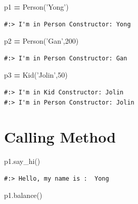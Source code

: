 \documentclass[
]{book}
\newenvironment{Shaded}{\begin{snugshade}}{\end{snugshade}}
\newcommand{\DecValTok}[1]{\textcolor[rgb]{0.06,0.06,0.06}{#1}}
\newcommand{\NormalTok}[1]{#1}
\newcommand{\OperatorTok}[1]{\textcolor[rgb]{0.43,0.43,0.43}{\textbf{#1}}}
\newcommand{\StringTok}[1]{\textcolor[rgb]{0.5,0.5,0.5}{#1}}
\begin{document}
\begin{Shaded}
\begin{Highlighting}[]
\NormalTok{p1 }\OperatorTok{=}\NormalTok{ Person(}\StringTok{'Yong'}\NormalTok{)  }
\end{Highlighting}
\end{Shaded}

\begin{verbatim}
#:> I'm in Person Constructor: Yong
\end{verbatim}

\begin{Shaded}
\begin{Highlighting}[]
\NormalTok{p2 }\OperatorTok{=}\NormalTok{ Person(}\StringTok{'Gan'}\NormalTok{,}\DecValTok{200}\NormalTok{)}
\end{Highlighting}
\end{Shaded}

\begin{verbatim}
#:> I'm in Person Constructor: Gan
\end{verbatim}

\begin{Shaded}
\begin{Highlighting}[]
\NormalTok{p3 }\OperatorTok{=}\NormalTok{ Kid(}\StringTok{'Jolin'}\NormalTok{,}\DecValTok{50}\NormalTok{)}
\end{Highlighting}
\end{Shaded}

\begin{verbatim}
#:> I'm in Kid Constructor: Jolin
#:> I'm in Person Constructor: Jolin
\end{verbatim}

\hypertarget{calling-method}{%
\section{Calling Method}\label{calling-method}}

\begin{Shaded}
\begin{Highlighting}[]
\NormalTok{p1.say_hi()}
\end{Highlighting}
\end{Shaded}

\begin{verbatim}
#:> Hello, my name is :  Yong
\end{verbatim}

\begin{Shaded}
\begin{Highlighting}[]
\NormalTok{p1.balance()}
\end{Highlighting}
\end{Shaded}
\end{document}
